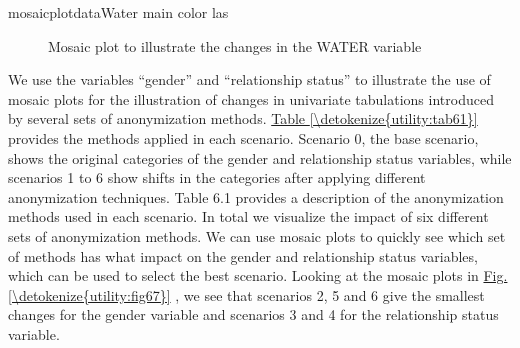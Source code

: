 \documentclass[letterpaper,10pt,english]{sphinxmanual}
\begin{document}
\begin{sphinxVerbatim}[commandchars=\\\{\},numbers=left,firstnumber=1,stepnumber=1]
mosaicplotdataWater main   color   las  
\end{sphinxVerbatim}

\begin{figure}[htbp]
\centering
\capstart

\noindent{}
\caption{Mosaic plot to illustrate the changes in the WATER variable}\label{\detokenize{utility:fig66}}\label{\detokenize{utility:id8}}\end{figure}

We use the variables “gender” and “relationship status” to illustrate
the use of mosaic plots for the illustration of changes in univariate
tabulations introduced by several sets of anonymization methods. \hyperref[\detokenize{utility:tab61}]{Table \ref{\detokenize{utility:tab61}}}
provides the methods applied in each scenario. Scenario 0, the base
scenario, shows the original categories of the gender and relationship
status variables, while scenarios 1 to 6 show shifts in the categories
after applying different anonymization techniques. Table 6.1 provides a
description of the anonymization methods used in each scenario. In total
we visualize the impact of six different sets of anonymization methods.
We can use mosaic plots to quickly see which set of methods has what
impact on the gender and relationship status variables, which can be
used to select the best scenario. Looking at the mosaic plots in \hyperref[\detokenize{utility:fig67}]{Fig.\@ \ref{\detokenize{utility:fig67}}} ,
we see that scenarios 2, 5 and 6 give the smallest changes for the
gender variable and scenarios 3 and 4 for the relationship status
variable.
\end{document}
